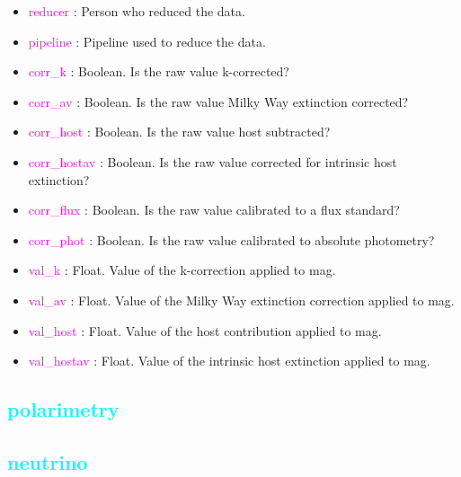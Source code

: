 \documentclass[tighten]{aastex631}
\newcommand{\property}[1]{\textcolor{cyan}{#1}}
\newcommand{\keyword}[1]{\textcolor{magenta}{#1}}
\begin{document}
\begin{itemize}
    \item \keyword{reducer} : Person who reduced the data.
    \item \keyword{pipeline} : Pipeline used to reduce the data.
    \item \keyword{corr\_k} : Boolean. Is the raw value k-corrected?
    \item \keyword{corr\_av} : Boolean. Is the raw value Milky Way extinction corrected?
    \item \keyword{corr\_host} : Boolean. Is the raw value host subtracted?
    \item \keyword{corr\_hostav} : Boolean. Is the raw value corrected for intrinsic host extinction?
    \item \keyword{corr\_flux} : Boolean. Is the raw value calibrated to a flux standard?
    \item \keyword{corr\_phot} : Boolean. Is the raw value calibrated to absolute photometry?
    \item \keyword{val\_k} : Float. Value of the k-correction applied to mag.
    \item \keyword{val\_av} : Float. Value of the Milky Way extinction correction applied to mag.
    \item \keyword{val\_host} : Float. Value of the host contribution applied to mag.
    \item \keyword{val\_hostav} : Float. Value of the intrinsic host extinction applied to mag.
\end{itemize}




\subsection{\property{polarimetry}} \label{sec:polarimetry}

\subsection{\property{neutrino}} \label{sec:neutrino}
\end{document}
